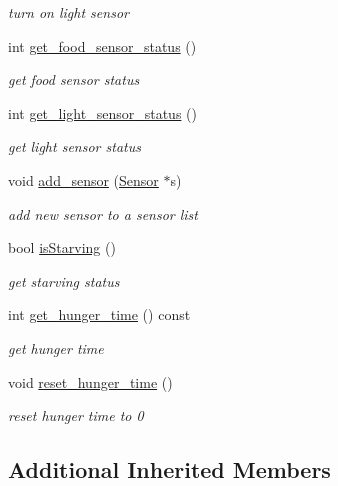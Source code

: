 \begin{DoxyCompactItemize}
\begin{DoxyCompactList}\small\item\em turn on light sensor \end{DoxyCompactList}\item 
int \hyperlink{classRobot_a3778716aaf14a6411a6f33b31cdc036d}{get\+\_\+food\+\_\+sensor\+\_\+status} ()
\begin{DoxyCompactList}\small\item\em get food sensor status \end{DoxyCompactList}\item 
int \hyperlink{classRobot_a3db3756764f58900971fb7bd3871d1ca}{get\+\_\+light\+\_\+sensor\+\_\+status} ()
\begin{DoxyCompactList}\small\item\em get light sensor status \end{DoxyCompactList}\item 
void \hyperlink{classRobot_a8effed8e20bf19557874ea0a8bc08e98}{add\+\_\+sensor} (\hyperlink{classSensor}{Sensor} $\ast$s)
\begin{DoxyCompactList}\small\item\em add new sensor to a sensor list \end{DoxyCompactList}\item 
bool \hyperlink{classRobot_ac9d8351881ab7350211f4aa6ab9cd97c}{is\+Starving} ()
\begin{DoxyCompactList}\small\item\em get starving status \end{DoxyCompactList}\item 
int \hyperlink{classRobot_a8fe9c782734c164980dc61a183de6949}{get\+\_\+hunger\+\_\+time} () const 
\begin{DoxyCompactList}\small\item\em get hunger time \end{DoxyCompactList}\item 
void \hyperlink{classRobot_a586e990a135a2e112ee69bb1b7ba54ee}{reset\+\_\+hunger\+\_\+time} ()\hypertarget{classRobot_a586e990a135a2e112ee69bb1b7ba54ee}{}\label{classRobot_a586e990a135a2e112ee69bb1b7ba54ee}

\begin{DoxyCompactList}\small\item\em reset hunger time to 0 \end{DoxyCompactList}\end{DoxyCompactItemize}
\subsection*{Additional Inherited Members}


